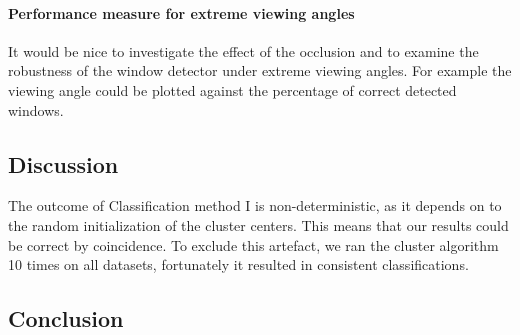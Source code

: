 \paragraph{Performance measure for extreme viewing angles}
It would be nice to investigate the effect of the occlusion and to examine the
robustness of the window detector under extreme viewing angles.
For example the viewing angle could be plotted against the percentage of
correct detected windows.



\subsection{Discussion}  %
The outcome of Classification method I is non-deterministic, as it depends on to the
random initialization of the cluster centers. This means that our results could be correct by
coincidence.  To exclude this artefact, we ran the cluster algorithm 10 times
on all datasets, fortunately it resulted in consistent classifications.






\subsection{Conclusion}




